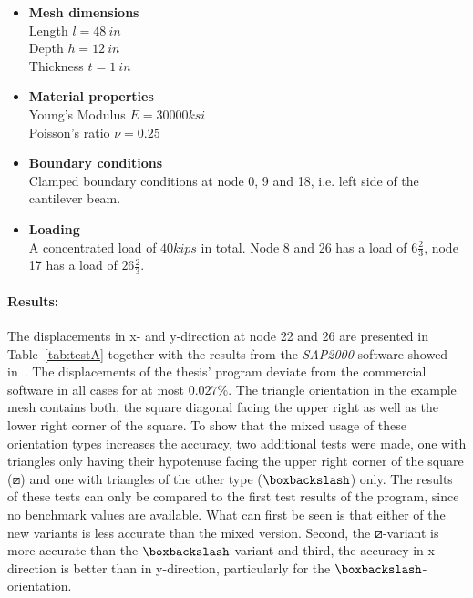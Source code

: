    \begin{itemize}
   \item \textbf{Mesh dimensions}\\
   Length $l = 48\ in$\\
   Depth $h = 12\ in$\\
   Thickness $t = 1\ in$
   
   \item \textbf{Material properties}\\
   Young's Modulus $E = 30000 ksi$\\
   Poisson's ratio $\nu = 0.25$\\
   
   \item \textbf{Boundary conditions}\\
   Clamped boundary conditions at node 0, 9 and 18, i.e. left side of the cantilever beam.
   
   \item \textbf{Loading}\\
   A concentrated load of $40 kips$ in total. Node 8 and 26 has a load of $6 \frac{2}{3}$, node 17 has a load of $26 \frac{2}{3}$.
   \end{itemize}
   
   \paragraph{Results:} The displacements in x- and y-direction at node 22 and 26 are presented in Table~\ref{tab:testA} together with the results from the \textit{SAP2000} software showed in~\cite{kansara2004development}. The displacements of the thesis' program deviate from the commercial software in all cases for at most $0.027\%$. The triangle orientation in the example mesh contains both, the square diagonal facing the upper right as well as the lower right corner of the square. To show that the mixed usage of these orientation types increases the accuracy, two additional tests were made, one with triangles only having their hypotenuse facing the upper right corner of the square ($\boxslash$) and one with triangles of the other type ($\boxbackslash$) only. The results of these tests can only be compared to the first test results of the program, since no benchmark values are available. What can first be seen is that either of the new variants is less accurate than the mixed version. Second, the $\boxslash$-variant is more accurate than the $\boxbackslash$-variant and third, the accuracy in x-direction is better than in y-direction, particularly for the $\boxbackslash$-orientation.
   
